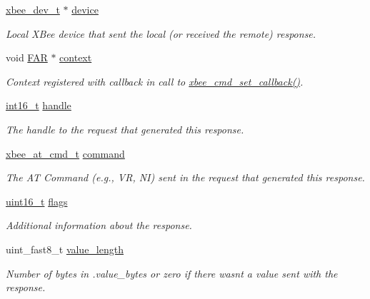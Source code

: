 \begin{DoxyCompactItemize}
\item 
\hyperlink{structxbee__dev__t}{xbee\+\_\+dev\+\_\+t} $\ast$ \hyperlink{structxbee__cmd__response__t_ac780e07a2b2cd8df18f56240588090c5}{device}
\begin{DoxyCompactList}\small\item\em Local X\+Bee device that sent the local (or received the remote) response. \end{DoxyCompactList}\item 
void \hyperlink{group__hal_gaef060b3456fdcc093a7210a762d5f2ed}{F\+AR} $\ast$ \hyperlink{structxbee__cmd__response__t_aa91f8e864e06077c354e5f5216547758}{context}
\begin{DoxyCompactList}\small\item\em Context registered with callback in call to \hyperlink{group__xbee__atcmd_ga0a5d2e2e87743061c46abd53e379e014}{xbee\+\_\+cmd\+\_\+set\+\_\+callback()}. \end{DoxyCompactList}\item 
\hyperlink{group__hal__dos_ga2140805d08462d474b82ddc8d1c2f3e6}{int16\+\_\+t} \hyperlink{structxbee__cmd__response__t_a1542542d7a68344e5d31df924a254df4}{handle}
\begin{DoxyCompactList}\small\item\em The handle to the request that generated this response. \end{DoxyCompactList}\item 
\hyperlink{unionxbee__at__cmd__t}{xbee\+\_\+at\+\_\+cmd\+\_\+t} \hyperlink{structxbee__cmd__response__t_aa1e66c60bb56acaced6ca2646fd44616}{command}
\begin{DoxyCompactList}\small\item\em The AT Command (e.\+g., VR, NI) sent in the request that generated this response. \end{DoxyCompactList}\item 
\hyperlink{group__hal__dos_ga5a8b2dc9e45a9ee81a94ef304fb62505}{uint16\+\_\+t} \hyperlink{structxbee__cmd__response__t_a1e87af3c18a2fd36c61faf89949bdc3f}{flags}
\begin{DoxyCompactList}\small\item\em Additional information about the response. \end{DoxyCompactList}\item 
uint\+\_\+fast8\+\_\+t \hyperlink{structxbee__cmd__response__t_a2c54a515e67816a5056c4526e22a91d9}{value\+\_\+length}
\begin{DoxyCompactList}\small\item\em Number of bytes in .value\+\_\+bytes or zero if there wasn\textquotesingle{}t a value sent with the response. \end{DoxyCompactList}\item 

\end{DoxyCompactItemize}
